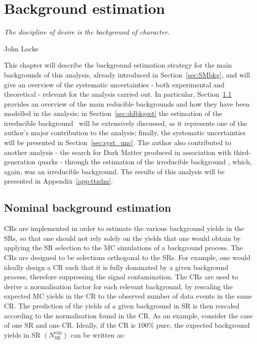 \chapter{Background estimation}
\label{ch:bkgest}
\epigraph{\emph{The discipline of desire is the background of character.}}{John Locke}

	This chapter will describe the background estimation strategy for the main backgrounds of this analysis, already introduced in Section~\ref{sec:SMbkg}, and will give an overview of the systematic uncertainties - both experimental and theoretical - relevant for the analysis carried out. In particular, Section~\ref{sec:bkgest} provides an overview of the main reducible backgrounds and how they have been modelled in the analysis; in Section~\ref{sec:ddbkgest} the estimation of the irreducible background \ttZ\ will be extensively discussed, as it represents one of the author's major contribution to the analysis; finally, the systematic uncertainties will be presented in Section~\ref{sec:syst_unc}. The author also contributed to another analysis - the search for Dark Matter produced in association with third-generation quarks - through the estimation of the irreducible background \ttZ, which, again, was an irreducible background. The results of this analysis will be presented in Appendix~\ref{app:ttzdm}. 

	\section{Nominal background estimation}
	\label{sec:bkgest}

		\acp{CR} are implemented in order to estimate the various background yields in the \acp{SR}, so that one should not rely solely on the yields that one would obtain by applying the \ac{SR} selection to the \ac{MC} simulations of a background process. The \acp{CR} are designed to be selections orthogonal to the \acp{SR}. For example, one would ideally design a \ac{CR} such that it is fully dominated by a given background process, therefore suppressing the signal contamination. The \acp{CR} are used to derive a normalisation factor for each relevant background, by rescaling the expected \ac{MC} yields in the \ac{CR} to the observed number of data events in the same \ac{CR}. The prediction of the yields of a given background in \ac{SR} is then rescaled according to the normalisation found in the \ac{CR}. As an example, consider the case of one \ac{SR} and one \ac{CR}. Ideally, if the \ac{CR} is $100\%$ pure, the expected background yields in \ac{SR} $\left(N_{\mathrm{SR}}^{\mathrm{exp}}\right)$ can be written as:


